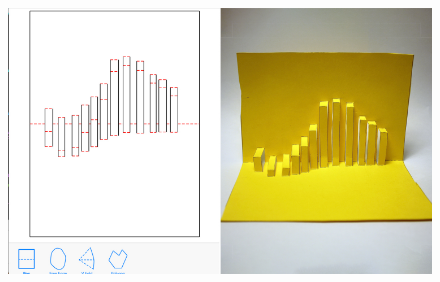 \begin{figure}[htbp]
\centering
\includegraphics{figures/93_Appendix_Sample_Cards/sine_combined.pdf}
\caption{}
\end{figure}
